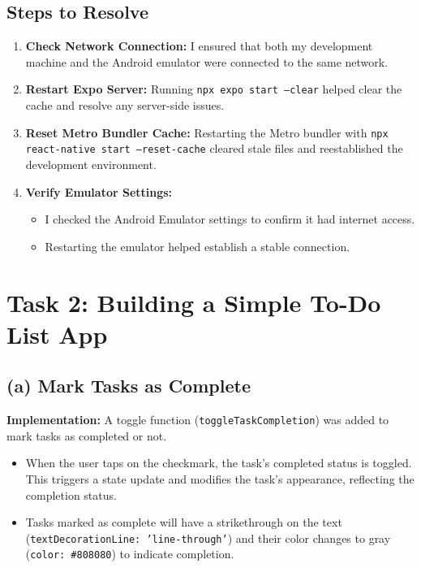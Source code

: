 \documentclass[12pt]{article}
\begin{document}
\subsection*{Steps to Resolve}
\begin{enumerate}
    \item \textbf{Check Network Connection:}  
    I ensured that both my development machine and the Android emulator were connected to the same network.
    \item \textbf{Restart Expo Server:}  
    Running \texttt{npx expo start --clear} helped clear the cache and resolve any server-side issues.
    \item \textbf{Reset Metro Bundler Cache:}  
    Restarting the Metro bundler with \texttt{npx react-native start --reset-cache} cleared stale files and reestablished the development environment.
    \item \textbf{Verify Emulator Settings:}  
    \begin{itemize}
        \item I checked the Android Emulator settings to confirm it had internet access.
        \item Restarting the emulator helped establish a stable connection.
    \end{itemize}
\end{enumerate}
\section*{Task 2: Building a Simple To-Do List App}
\subsection*{(a) Mark Tasks as Complete}
\textbf{Implementation:}  
A toggle function (\texttt{toggleTaskCompletion}) was added to mark tasks as completed or not.  
\begin{itemize}[left=1.5em]
    \item When the user taps on the checkmark, the task's completed status is toggled. This triggers a state update and modifies the task's appearance, reflecting the completion status.
    \item Tasks marked as complete will have a strikethrough on the text (\texttt{textDecorationLine: 'line-through'}) and their color changes to gray (\texttt{color: \#808080}) to indicate completion.
\end{itemize}
\end{document}
